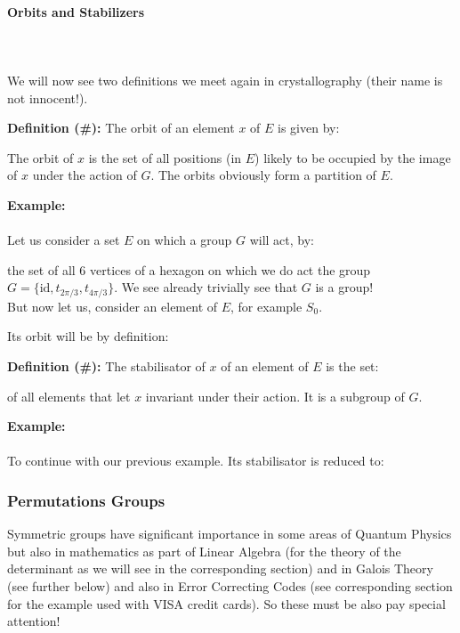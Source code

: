 	\pagebreak
	\paragraph{Orbits and Stabilizers}\mbox{}\\\\
	We will now see two definitions we meet again in crystallography (their name is not innocent!).
	
	\textbf{Definition (\#\mydef):} The orbit of an element $x$ of $E$ is given by:
	
	The orbit of $x$ is the set of all positions (in $E$) likely to be occupied by the image of $x$ under the action of $G$. The orbits obviously form a partition of $E$.
	\begin{tcolorbox}[colframe=black,colback=white,sharp corners]
	\textbf{{\Large {}}Example:}\\\\
	Let us consider a set $E$ on which a group $G$ will act, by:
	
	the set of all $6$ vertices of a hexagon on which we do act the group $G=\{\text{id},t_{2\pi/3},t_{4\pi/3}\}$. We see already trivially see that $G$ is a group!  \\
	
	But now let us, consider an element of $E$, for example $S_0$.
	
	Its orbit will be by definition:
	
	\end{tcolorbox}
	\textbf{Definition (\#\mydef):} The stabilisator of $x$ of an element of $E$ is the set:
	
	of all elements that let $x$ invariant under their action. It is a subgroup of $G$.
	\begin{tcolorbox}[colframe=black,colback=white,sharp corners]
	\textbf{{\Large {}}Example:}\\\\
	To continue with our previous example. Its stabilisator is reduced to:
	
	\end{tcolorbox}
	
	
	\pagebreak
	\subsubsection{Permutations Groups}
	Symmetric groups have significant importance in some areas of Quantum Physics but also in mathematics as part of Linear Algebra (for the theory of the determinant as we will see in the corresponding section) and in Galois Theory (see further below) and also in Error Correcting Codes (see corresponding section for the example used with VISA credit cards). So these must be also pay special attention!
	
